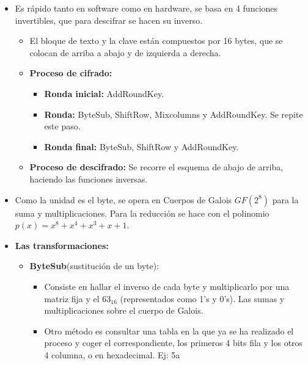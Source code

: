 \documentclass[12pt, twoside, openright]{report} %
\begin{document}
\begin{itemize}
\begin{itemize}
    \item Es rápido tanto en software como en hardware, se basa en 4
      funciones invertibles, que para descifrar se hacen su inverso.
      

      \begin{itemize}
      \item El bloque de texto y la clave están compuestos por 16 bytes, que
        se colocan de arriba a abajo y de izquierda a derecha.
        
      \item \textbf{Proceso de cifrado:}
        

        \begin{itemize}
        \item \textbf{Ronda inicial:} AddRoundKey.
          
        \item \textbf{Ronda:} ByteSub, ShiftRow, Mixcolumns y AddRoundKey.
          Se repite este paso.
          
        \item \textbf{Ronda final:} ByteSub, ShiftRow y AddRoundKey.
          
        \end{itemize}
      \item \textbf{Proceso de descifrado:} Se recorre el esquema de abajo
        de arriba, haciendo las funciones inversas.
        
      \end{itemize}
    \item Como la unidad es el byte, se opera en Cuerpos de Galois $GF(2^8)$
      para la suma y multiplicaciones. Para la reducción se hace con el
      polinomio $p(x)=x^8+x^4+x^3+x+1$.
      
    \item \textbf{Las transformaciones:}
      

      \begin{itemize}
      \item \textbf{ByteSub}(sustitución de un byte):
        

        \begin{itemize}
        \item Consiste en hallar el inverso de cada byte y multiplicarlo por
          una matriz fija y el $63_{16}$ (representados como 1's y 0's). Las
          sumas y multiplicaciones sobre el cuerpo de Galois.
          
        \item Otro método es consultar una tabla en la que ya se ha
          realizado el proceso y coger el correspondiente, los primeros
          4 bits fila y los otros 4 columna, o en hexadecimal. Ej: 5a
          

\end{itemize}
\end{itemize}
\end{itemize}
\end{itemize}
\end{document}
